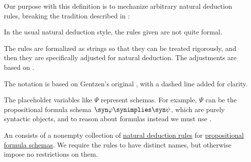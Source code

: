 \begin{comments}
  \item Our purpose with this definition is to mechanize arbitrary natural deduction rules, breaking the tradition described in \cite[13]{MartinLöf1984IntuitionisticTypeTheory}:
  \begin{displayquote}
    In the usual natural deduction style, the rules given are not quite formal.
  \end{displayquote}

  The rules are formalized as strings so that they can be treated rigorously, and then they are specifically adjusted for natural deduction. The adjustments are based on \cite[\S 2.1]{TroelstraSchwichtenberg2000BasicProofTheory}.

  The notation is based on Gentzen's original \cite[186]{Gentzen1935LogischeSchließen}, with a dashed line added for clarity.

  \item The placeholder variables like \( \Psi \) represent schemas. For example, \( \Psi \) can be the propositional formula schema \( \syn\varphi \synimplies \syn\psi \), which are purely syntactic objects, and to reason about formulas instead we must use .
\end{comments}

\begin{definition}\label{def:propositional_natural_deduction_system}\mimprovised
  An  consists of a nonempty collection of \hyperref[def:natural_deduction_rule]{natural deduction rules} for \hyperref[def:propositional_formula_schema]{propositional formula schemas}. We require the rules to have distinct names, but otherwise impose no restrictions on them.
\end{definition}

